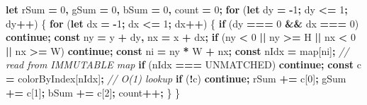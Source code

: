 \documentclass[
  11pt,
  oneside]{report}
\newenvironment{Shaded}{\begin{snugshade}}{\end{snugshade}}
\newcommand{\CommentTok}[1]{\textcolor[rgb]{0.56,0.35,0.01}{\textit{#1}}}
\newcommand{\ControlFlowTok}[1]{\textcolor[rgb]{0.13,0.29,0.53}{\textbf{#1}}}
\newcommand{\DecValTok}[1]{\textcolor[rgb]{0.00,0.00,0.81}{#1}}
\newcommand{\KeywordTok}[1]{\textcolor[rgb]{0.13,0.29,0.53}{\textbf{#1}}}
\newcommand{\NormalTok}[1]{#1}
\newcommand{\OperatorTok}[1]{\textcolor[rgb]{0.81,0.36,0.00}{\textbf{#1}}}
\begin{document}
\begin{Shaded}
\begin{Highlighting}[]
    \KeywordTok{let}\NormalTok{ rSum }\OperatorTok{=} \DecValTok{0}\OperatorTok{,}\NormalTok{ gSum }\OperatorTok{=} \DecValTok{0}\OperatorTok{,}\NormalTok{ bSum }\OperatorTok{=} \DecValTok{0}\OperatorTok{,}\NormalTok{ count }\OperatorTok{=} \DecValTok{0}\OperatorTok{;}
    \ControlFlowTok{for}\NormalTok{ (}\KeywordTok{let}\NormalTok{ dy }\OperatorTok{=} \OperatorTok{{-}}\DecValTok{1}\OperatorTok{;}\NormalTok{ dy }\OperatorTok{\textless{}=} \DecValTok{1}\OperatorTok{;}\NormalTok{ dy}\OperatorTok{++}\NormalTok{) \{}
      \ControlFlowTok{for}\NormalTok{ (}\KeywordTok{let}\NormalTok{ dx }\OperatorTok{=} \OperatorTok{{-}}\DecValTok{1}\OperatorTok{;}\NormalTok{ dx }\OperatorTok{\textless{}=} \DecValTok{1}\OperatorTok{;}\NormalTok{ dx}\OperatorTok{++}\NormalTok{) \{}
        \ControlFlowTok{if}\NormalTok{ (dy }\OperatorTok{===} \DecValTok{0} \OperatorTok{\&\&}\NormalTok{ dx }\OperatorTok{===} \DecValTok{0}\NormalTok{) }\ControlFlowTok{continue}\OperatorTok{;}
        \KeywordTok{const}\NormalTok{ ny }\OperatorTok{=}\NormalTok{ y }\OperatorTok{+}\NormalTok{ dy}\OperatorTok{,}\NormalTok{ nx }\OperatorTok{=}\NormalTok{ x }\OperatorTok{+}\NormalTok{ dx}\OperatorTok{;}
        \ControlFlowTok{if}\NormalTok{ (ny }\OperatorTok{\textless{}} \DecValTok{0} \OperatorTok{||}\NormalTok{ ny }\OperatorTok{\textgreater{}=}\NormalTok{ H }\OperatorTok{||}\NormalTok{ nx }\OperatorTok{\textless{}} \DecValTok{0} \OperatorTok{||}\NormalTok{ nx }\OperatorTok{\textgreater{}=}\NormalTok{ W) }\ControlFlowTok{continue}\OperatorTok{;}
        \KeywordTok{const}\NormalTok{ ni }\OperatorTok{=}\NormalTok{ ny }\OperatorTok{*}\NormalTok{ W }\OperatorTok{+}\NormalTok{ nx}\OperatorTok{;}
        \KeywordTok{const}\NormalTok{ nIdx }\OperatorTok{=}\NormalTok{ map[ni]}\OperatorTok{;}         \CommentTok{// read from IMMUTABLE map}
        \ControlFlowTok{if}\NormalTok{ (nIdx }\OperatorTok{===}\NormalTok{ UNMATCHED) }\ControlFlowTok{continue}\OperatorTok{;}
        \KeywordTok{const}\NormalTok{ c }\OperatorTok{=}\NormalTok{ colorByIndex[nIdx]}\OperatorTok{;} \CommentTok{// O(1) lookup}
        \ControlFlowTok{if}\NormalTok{ (}\OperatorTok{!}\NormalTok{c) }\ControlFlowTok{continue}\OperatorTok{;}
\NormalTok{        rSum }\OperatorTok{+=}\NormalTok{ c[}\DecValTok{0}\NormalTok{]}\OperatorTok{;}\NormalTok{ gSum }\OperatorTok{+=}\NormalTok{ c[}\DecValTok{1}\NormalTok{]}\OperatorTok{;}\NormalTok{ bSum }\OperatorTok{+=}\NormalTok{ c[}\DecValTok{2}\NormalTok{]}\OperatorTok{;}\NormalTok{ count}\OperatorTok{++;}
\NormalTok{      \}}
\NormalTok{    \}}


\end{Highlighting}
\end{Shaded}
\end{document}
